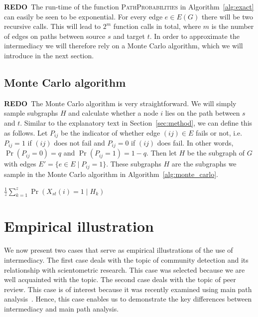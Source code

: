 \documentclass{article}
\theoremstyle{definition}
\newcommand{\redo}[1]{{\bf\color{orange}REDO}~{\color{blue}#1}}
\begin{document}
\redo{The run-time of the function \textsc{PathProbabilities} in Algorithm~\ref{alg:exact} can easily be seen to be exponential.
For every edge $e \in E(G)$ there will be two recursive calls.
This will lead to $2^m$ function calls in total, where $m$ is the number of edges on paths between source $s$ and target $t$.
In order to approximate the intermediacy we will therefore rely on a Monte Carlo algorithm, which we will introduce in the next section.}

\subsection{Monte Carlo algorithm}

\redo{The Monte Carlo algorithm is very straightforward.
We will simply sample subgraphs $H$ and calculate whether a node $i$ lies on the path between $s$ and $t$.
Similar to the explanatory text in Section~\ref{sec:method}, we can define this as follows.
Let $P_{ij}$ be the indicator of whether edge $(ij) \in E$ fails or not, i.e. $P_{ij} = 1$ if $(ij)$ does not fail and $P_{ij} = 0$ if $(ij)$ does fail.
In other words, $\Pr(P_{ij} = 0) = q$ and $\Pr(P_{ij} = 1) = 1 - q$.
Then let $H$ be the subgraph of $G$ with edges $E' = \{ e \in E \mid P_{ij} = 1\}$.
These subgraphs $H$ are the subgraphs we sample in the Monte Carlo algorithm in Algorithm~\ref{alg:monte_carlo}.}

\begin{algorithm}[bt]
  \begin{algorithmic}[1]
    \State \Return $\frac{1}{z} \sum_{k=1}^z \Pr(X_{st}(i) = 1 \mid H_k)$ %
		\EndFunction
	\end{algorithmic}
	\caption{\redo{Monte Carlo algorithm for calculating intermediacy.}}
	\label{alg:monte_carlo}
\end{algorithm}

%
%

\section{\label{sec:empirical}Empirical illustration}

We now present two cases that serve as empirical illustrations of the use of intermediacy. The first case deals with the topic of community detection and its relationship with scientometric research. This case was selected because we are well acquainted with the topic. The second case deals with the topic of peer review. This case is of interest because it was recently examined using main path analysis~\cite{Batagelj2017}. Hence, this case enables us to demonstrate the key differences between intermediacy and main path analysis.
\end{document}
